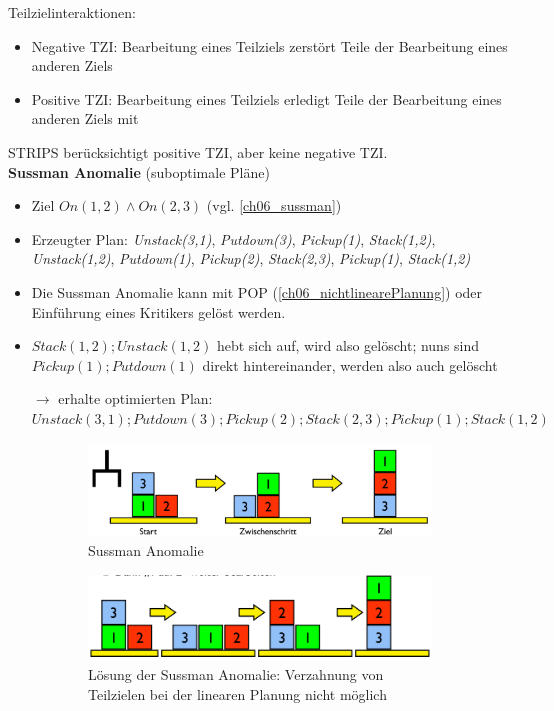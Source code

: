 Teilzielinteraktionen:
\begin{itemize}
	\item Negative TZI: Bearbeitung eines Teilziels zerstört Teile der Bearbeitung eines anderen Ziels
	\item Positive TZI: Bearbeitung eines Teilziels erledigt Teile der Bearbeitung eines anderen Ziels mit
\end{itemize}
STRIPS berücksichtigt positive TZI, aber keine negative TZI.\\

\textbf{Sussman Anomalie} (suboptimale Pläne)
\begin{itemize}
	\item Ziel $On(1,2) \wedge On(2,3)$ (vgl. \autoref{ch06_sussman})
	\item Erzeugter Plan: \emph{Unstack(3,1)}, \emph{Putdown(3)}, \emph{Pickup(1)}, \emph{Stack(1,2)}, \emph{Unstack(1,2)}, \emph{Putdown(1)}, \emph{Pickup(2)}, \emph{Stack(2,3)}, \emph{Pickup(1)}, \emph{Stack(1,2)}
	\item Die Sussman Anomalie kann mit POP (\autoref{ch06_nichtlinearePlanung}) oder Einführung eines Kritikers gelöst werden.
	\item $Stack(1,2); Unstack(1,2)$ hebt sich auf, wird also gelöscht; nuns sind $Pickup(1); Putdown(1)$ direkt hintereinander, werden also auch gelöscht
	\item[$\rightarrow$] erhalte optimierten Plan: $Unstack(3,1); Putdown(3); Pickup(2); Stack(2,3); Pickup(1); Stack(1,2)$
\end{itemize}

\begin{figure}[!ht]\centering
	\begin{subfigure}{.8\textwidth} 
		\includegraphics[width=\textwidth]{figures/ch06_sussman.png}
		\caption{Sussman Anomalie}
		\label{ch06_sussman}
	\end{subfigure}
	\begin{subfigure}{.8\textwidth} 
		\includegraphics[width=\textwidth]{figures/ch06_sm-lsg.png}
		\caption{L\"{o}sung der Sussman Anomalie: Verzahnung von Teilzielen bei der linearen Planung nicht möglich}
		\label{ch06_sm-lsg}
	\end{subfigure}
	\caption{}
\end{figure}

